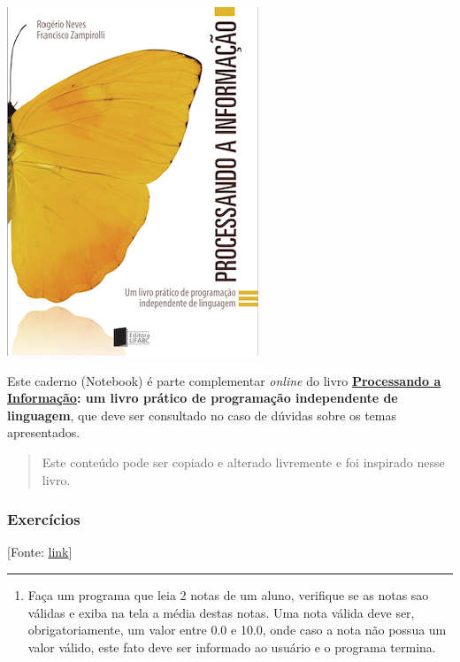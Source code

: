 \documentclass[12pt,a4paper]{article}
\providecommand{\tightlist}{%
      \setlength{\itemsep}{0pt}\setlength{\parskip}{0pt}}
\begin{document}
    \includegraphics{"figs/Capa_Processando_Informacao.jpg"}

Este caderno (Notebook) é parte complementar \emph{online} do livro
\textbf{\href{https://editora.ufabc.edu.br/matematica-e-ciencias-da-computacao/58-processando-a-informacao}{Processando
a Informação}: um livro prático de programação independente de
linguagem}, que deve ser consultado no caso de dúvidas sobre os temas
apresentados.

\begin{quote}
Este conteúdo pode ser copiado e alterado livremente e foi inspirado
nesse livro.
\end{quote}

    \hypertarget{exercuxedcios}{%
\subsubsection{Exercícios}\label{exercuxedcios}}

{[}Fonte:
\href{http://www.facom.ufu.br/~backes/gbt017/ListaPython02.pdf}{link}{]}

    \begin{center}\rule{0.5\linewidth}{0.5pt}\end{center}

\begin{enumerate}
\def\labelenumi{\arabic{enumi}.}
\tightlist
\item
  Faça um programa que leia 2 notas de um aluno, verifique se as notas
  sao válidas e exiba na tela a média destas notas. Uma nota válida deve
  ser, obrigatoriamente, um valor entre 0.0 e 10.0, onde caso a nota não
  possua um valor válido, este fato deve ser informado ao usuário e o
  programa termina.
\end{enumerate}
\end{document}

